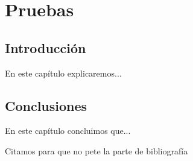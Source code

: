 \chapter{Pruebas}\label{cap:pruebas}

\section{Introducción}
En este capítulo explicaremos...

\section{Conclusiones}
En este capítulo concluimos que...

Citamos para que no pete la parte de bibliografía \cite{borrego2019}
